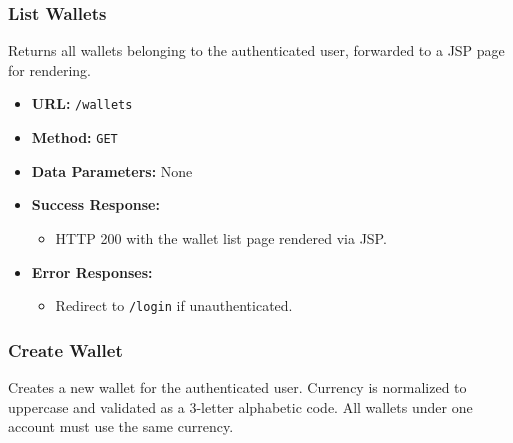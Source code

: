 
\subsubsection{List Wallets}

Returns all wallets belonging to the authenticated user, forwarded to a JSP page for rendering.

\begin{itemize}
    \item \textbf{URL:} \texttt{/wallets}
    \item \textbf{Method:} \texttt{GET}
    \item \textbf{Data Parameters:} None
    \item \textbf{Success Response:}
    \begin{itemize}
        \item HTTP 200 with the wallet list page rendered via JSP.
    \end{itemize}
    \item \textbf{Error Responses:}
    \begin{itemize}
        \item Redirect to \texttt{/login} if unauthenticated.
    \end{itemize}
\end{itemize}

\subsubsection{Create Wallet}

Creates a new wallet for the authenticated user. Currency is normalized to uppercase and validated as a 3-letter alphabetic code. All wallets under one account must use the same currency.

